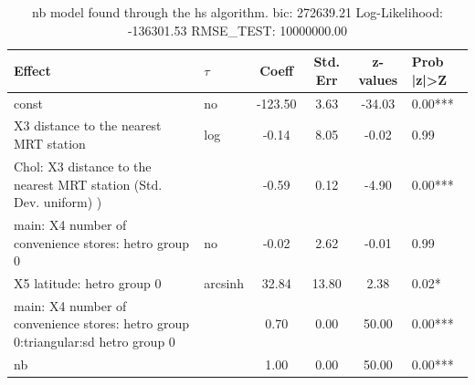 \begin{table}
	\caption{nb model found through the hs algorithm. bic: 272639.21 Log-Likelihood: -136301.53 RMSE_TEST: 10000000.00}
	\begin{center}
		\begin{tabular}{|l|l|c|c|c|l|}
			\hline
			Effect & $\tau$ & Coeff & Std. Err & z-values & Prob |z|>Z \\
			\hline
			const & no & -123.50 & 3.63 & -34.03 & 0.00*** \\
			\hline
			X3 distance to the nearest MRT station & log & -0.14 & 8.05 & -0.02 & 0.99 \\
			\hline
			 Chol: X3 distance to the nearest MRT station (Std. Dev. uniform) ) &  & -0.59 & 0.12 & -4.90 & 0.00*** \\
			\hline
			main: X4 number of convenience stores: hetro group 0 & no & -0.02 & 2.62 & -0.01 & 0.99 \\
			\hline
			X5 latitude: hetro group 0 & arcsinh & 32.84 & 13.80 & 2.38 & 0.02* \\
			\hline
			main: X4 number of convenience stores: hetro group 0:triangular:sd  hetro group 0 &  & 0.70 & 0.00 & 50.00 & 0.00*** \\
			\hline
			nb &  & 1.00 & 0.00 & 50.00 & 0.00*** \\
			\hline
		\end{tabular}
	\end{center}
\end{table}